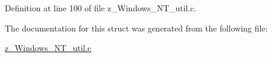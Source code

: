 Definition at line 100 of file z\-\_\-\-Windows\-\_\-\-N\-T\-\_\-util.\-c.



The documentation for this struct was generated from the following file\-:\begin{DoxyCompactItemize}
\item 
\hyperlink{z__Windows__NT__util_8c}{z\-\_\-\-Windows\-\_\-\-N\-T\-\_\-util.\-c}\end{DoxyCompactItemize}

